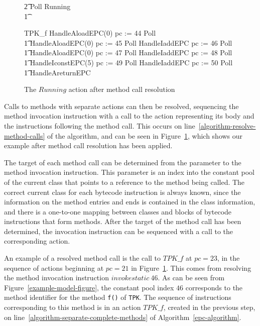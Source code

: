 \begin{figure}[t!]
\begin{circus}
    \t2 \circfi \circseq Poll \circseq Running \\
    \t1 \circfi
  \end{circus}
  \vspace{-1cm}
  \begin{circus}
    TPK\_f \circdef HandleAloadEPC(0) \circseq pc := 44 \circseq Poll \circseq \\
    \t1 HandleAloadEPC(0) \circseq pc := 45 \circseq Poll \circseq HandleIaddEPC \circseq pc := 46 \circseq Poll \circseq \\
    \t1 HandleAloadEPC(0) \circseq pc := 47 \circseq Poll \circseq HandleIaddEPC \circseq pc := 48 \circseq Poll \circseq \\
    \t1 HandleIconstEPC(5) \circseq pc := 49 \circseq Poll \circseq HandleIaddEPC \circseq pc := 50 \circseq Poll \circseq \\
    \t1 HandleAreturnEPC
  \end{circus}
  \caption{The $Running$ action after method call resolution}
  \label{method-call-resolution-example-figure}
\end{figure}

Calls to methods with separate actions can then be resolved,
sequencing the method invocation instruction with a call to the
\Circus{} action representing its body and the instructions following
the method call. 
This occurs on line~\ref{algorithm-resolve-method-calls} of the
algorithm, and can be seen in
Figure~\ref{method-call-resolution-example-figure}, which shows our
example after method call resolution has been applied.

The target of each method call can be determined from the parameter to
the method invocation instruction.
This parameter is an index into the constant pool of the current class
that points to a reference to the method being called.
The correct current class for each bytecode instruction is always
known, since the information on the method entries and ends is
contained in the class information, and there is a one-to-one mapping
between classes and blocks of bytecode instructions that form methods.
After the target of the method call has been determined, the
invocation instruction can be sequenced with a call to the
corresponding \Circus{} action.

An example of a resolved method call is the call to $TPK\_f$ at
$pc = 23$, in the sequence of actions beginning at $pc = 21$ in
Figure~\ref{method-call-resolution-example-figure}. 
This comes from resolving the method invocation instruction
$invokestatic~46$.
As can be seen from Figure~\ref{example-model-figure}, the constant
pool index $46$ corresponds to the method identifier for the method
\texttt{f()} of \texttt{TPK}.
The sequence of instructions corresponding to this method is in an
action $TPK\_f$, created in the previous step, on
line~\ref{algorithm-separate-complete-methods} of
Algorithm~\ref{epc-algorithm}.

